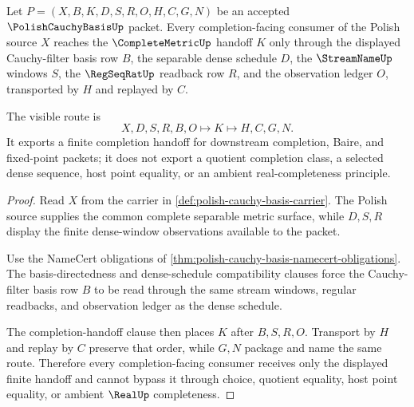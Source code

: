 \begin{theorem}
\label{thm:polish-cauchy-basis-completion-handoff}
Let $P=(X,B,K,D,S,R,O,H,C,G,N)$ be an accepted
$\PolishCauchyBasisUp$ packet. Every completion-facing consumer of the Polish
source $X$ reaches the $\CompleteMetricUp$ handoff $K$ only through the
displayed Cauchy-filter basis row $B$, the separable dense schedule $D$, the
$\StreamNameUp$ windows $S$, the $\RegSeqRatUp$ readback row $R$, and the
observation ledger $O$, transported by $H$ and replayed by $C$.

The visible route is
$$
X,D,S,R,B,O \longmapsto K \longmapsto H,C,G,N .
$$
It exports a finite completion handoff for downstream completion, Baire, and
fixed-point packets; it does not export a quotient completion class, a
selected dense sequence, host point equality, or an ambient real-completeness
principle.
\end{theorem}
\begin{proof}
Read $X$ from the carrier in \autoref{def:polish-cauchy-basis-carrier}. The
Polish source supplies the common complete separable metric surface, while
$D,S,R$ display the finite dense-window observations available to the packet.

Use the NameCert obligations of
\autoref{thm:polish-cauchy-basis-namecert-obligations}. The basis-directedness
and dense-schedule compatibility clauses force the Cauchy-filter basis row
$B$ to be read through the same stream windows, regular readbacks, and
observation ledger as the dense schedule.

The completion-handoff clause then places $K$ after $B,S,R,O$. Transport by
$H$ and replay by $C$ preserve that order, while $G,N$ package and name the
same route. Therefore every completion-facing consumer receives only the
displayed finite handoff and cannot bypass it through choice, quotient
equality, host point equality, or ambient $\RealUp$ completeness.
\end{proof}


